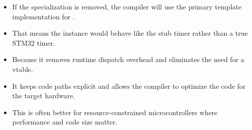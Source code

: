 \begin{itemize}
  \item If the specialization is removed, the compiler will use the primary template
    implementation for .
  \item That means the instance would behave like the stub timer rather than a true STM32 timer.
\end{itemize}

\begin{itemize}
  \item Because it removes runtime dispatch overhead and eliminates the need for a vtable.
  \item It keeps code paths explicit and allows the compiler to optimize the code for the target
    hardware.
  \item This is often better for resource-constrained microcontrollers where performance and code
    size matter.
\end{itemize}
